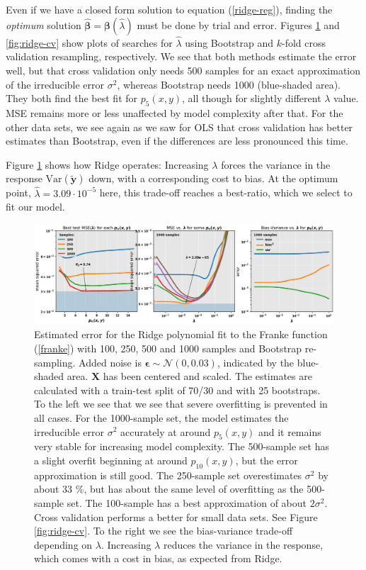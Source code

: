 \documentclass[]{article}
\begin{document}
Even if we have a closed form solution to equation (\ref{ridge-reg}), finding the \textit{optimum} solution $\mathbf{\hat{\beta}} = \mathbf{\beta}(\hat{\lambda})$ must be done by trial and error. Figures \ref{fig:ridge-bootstrap} and \ref{fig:ridge-cv} show plots of searches for $\hat{\lambda}$ using Bootstrap and $k$-fold cross validation resampling, respectively. We see that both methods estimate the error well, but that cross validation only needs 500 samples for an exact approximation of the irreducible error $\sigma^2$, whereas Bootstrap needs 1000 (blue-shaded area). They both find the best fit for $p_5(x,y)$, all though for slightly different $\lambda$ value. MSE remains more or less unaffected by model complexity after that. For the other data sets, we see again as we saw for OLS that cross validation has better estimates than Bootstrap, even if the differences are less pronounced this time.

Figure \ref{fig:ridge-bootstrap} shows how Ridge operates: Increasing $\lambda$ forces the variance in the response $\mathrm{Var}(\mathbf{\tilde{y}})$ down, with a corresponding cost to bias. At the optimum point, $\hat{\lambda} = 3.09 \cdot 10^{-5}$ here, this trade-off reaches a best-ratio, which we select to fit our model.

\begin{figure}[!htb]
	\centering
	\includegraphics[width=1\linewidth]{./results/ridge-bootstrap.png}
	\caption{Estimated error for the Ridge polynomial fit to the Franke function (\ref{franke}) with 100, 250, 500 and 1000 samples and Bootstrap re-sampling. Added noise is $\mathbf{\epsilon} \sim \mathcal{N}(0, 0.03)$, indicated by the blue-shaded area. $\mathbf{X}$ has been centered and scaled. The estimates are calculated with a train-test split of 70/30 and with 25 bootstraps. To the left we see that we see that severe overfitting is prevented in all cases. For the 1000-sample set, the model estimates the irreducible error $\sigma^2$ accurately at around $p_5(x,y)$ and it remains very stable for increasing model complexity. The 500-sample set has a slight overfit beginning at around $p_{10}(x,y)$, but the error approximation is still good. The 250-sample set overestimates $\sigma^2$ by about 33 \%, but has about the same level of overfitting as the 500-sample set. The 100-sample has a best approximation of about $2\sigma^2$. Cross validation performs a better for small data sets. See Figure \ref{fig:ridge-cv}. To the right we see the bias-variance trade-off depending on $\lambda$. Increasing $\lambda$ reduces the variance in the response, which comes with a cost in bias, as expected from Ridge.}
	\label{fig:ridge-bootstrap}
\end{figure}
\end{document}
